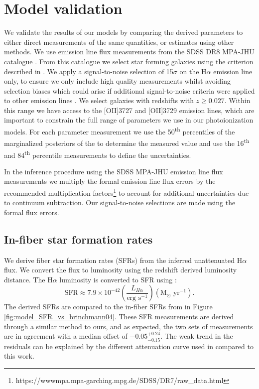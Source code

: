 \documentclass[fleqn,usenatbib]{mnras}
\begin{document}
\section{Model validation}
\label{sec:model_validation}
We validate the results of our models by comparing the derived parameters to either direct measurements of the same quantities, or estimates using other methods. We use emission line flux measurements from the SDSS DR8 MPA-JHU catalogue \citep{brinchmann2004, kauffmann2003a, tremonti2004}. From this catalogue we select star forming galaxies using the criterion described in \cite{kauffmann2003}. We apply a signal-to-noise selection of 15$\sigma$ on the H$\alpha$ emission line only, to ensure we only include high quality measurements whilst avoiding selection biases which could arise if additional signal-to-noise criteria were applied to other emission lines \citep{yates2012, kashino2016}. We select galaxies with redshifts with $z \geq 0.027$. Within this range we have access to the [OII]3727 and [OII]3729 emission lines, which are important to constrain the full range of parameters we use in our photoionization models. For each parameter measurement we use the 50\textsuperscript{th} percentiles of the marginalized posteriors of the to determine the measured value and use the 16\textsuperscript{th} and 84\textsuperscript{th} percentile measurements to define the uncertainties.

In the inference procedure using the SDSS MPA-JHU emission line flux measurements we multiply the formal emission line flux errors by the recommended multiplication factors\footnote{https://wwwmpa.mpa-garching.mpg.de/SDSS/DR7/raw\_data.html} to account for additional uncertainties due to continuum subtraction. Our signal-to-noise selections are made using the formal flux errors.

\subsection{In-fiber star formation rates}
We derive fiber star formation rates (SFRs) from the inferred unattenuated H$\alpha$ flux. We convert the flux to luminosity using the redshift derived luminosity distance. The H$\alpha$ luminosity is converted to SFR using \cite{kennicutt1998}:
\begin{equation}
    \textrm{SFR} \approx 7.9 \times 10^{-42} \left( \frac{L_{H\alpha}}{\textrm{erg s}^{-1}} \right) (\textrm{M}_{\odot} \textrm{ yr}^{-1}) .
\end{equation}
The derived SFRs are compared to the in-fiber SFRs from \cite{brinchmann2004} in Figure \ref{fig:model_SFR_vs_brinchmann04}. These SFR measurements are derived through a similar method to ours, and as expected, the two sets of measurements are in agreement with a median offset of $-$0.05$_{-0.15}^{+0.24}$. The weak trend in the residuals can be explained by the different attenuation curve used in \cite{brinchmann2004} compared to this work.
\end{document}
